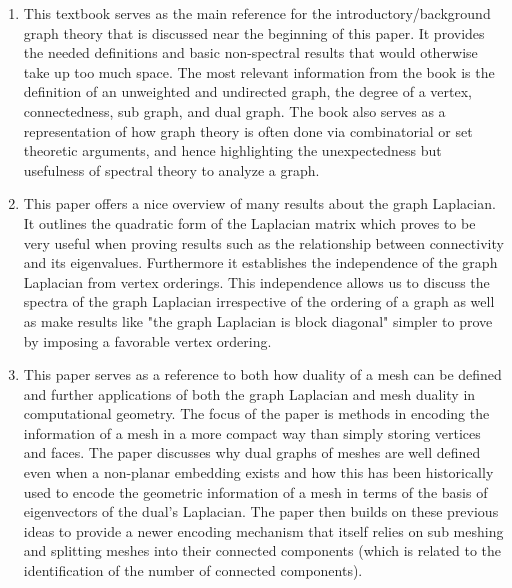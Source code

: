 \documentclass{article}
\begin{document}
\begin{enumerate}
    \item {}

    \medskip

    This textbook serves as the main reference for the introductory/background graph theory that is discussed near the beginning of this paper. It provides the needed definitions and basic non-spectral results that would otherwise take up too much space. The most relevant information from the book is the definition of an unweighted and undirected graph, the degree of a vertex, connectedness, sub graph, and dual graph. The book also serves as a representation of how graph theory is often done via combinatorial or set theoretic arguments, and hence highlighting the unexpectedness but usefulness of spectral theory to analyze a graph.

    \item {}

    \medskip

    This paper offers a nice overview of many results about the graph Laplacian. It outlines the quadratic form of the Laplacian matrix which proves to be very useful when proving results such as the relationship between connectivity and its eigenvalues. Furthermore it establishes the independence of the graph Laplacian from vertex orderings. This independence allows us to discuss the spectra of the graph Laplacian irrespective of the ordering of a graph as well as make results like "the graph Laplacian is block diagonal" simpler to prove by imposing a favorable vertex ordering.

    \item {}

    \medskip

    This paper serves as a reference to both how duality of a mesh can be defined and further applications of both the graph Laplacian and mesh duality in computational geometry. The focus of the paper is methods in encoding the information of a mesh in a more compact way than simply storing vertices and faces. The paper discusses why dual graphs of meshes are well defined even when a non-planar embedding exists and how this has been historically used to encode the geometric information of a mesh in terms of the basis of eigenvectors of the dual's Laplacian. The paper then builds on these previous ideas to provide a newer encoding mechanism that itself relies on sub meshing and splitting meshes into their connected components (which is related to the identification of the number of connected components).
\end{enumerate}
\end{document}
